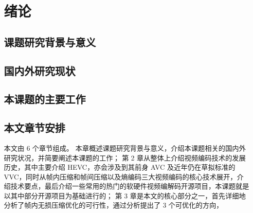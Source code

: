 \chapter{绪论}
\label{cha:c1}

\section{课题研究背景与意义}

\section{国内外研究现状}

\section{本课题的主要工作}

\section{本文章节安排}
本文由 6 个章节组成。
本章概述课题研究背景与意义，介绍本课题相关的国内外研究状况，并简要阐述本课题的工作；
第 2 章从整体上介绍视频编码技术的发展历史，其中主要介绍 HEVC，亦会涉及到其前身 AVC 及近年仍在草拟标准的 VVC，同时从帧内压缩和帧间压缩以及熵编码三大视频编码的核心技术展开，介绍技术要点，最后介绍一些常用的热门的软硬件视频编解码开源项目，本课题就是以其中部分开源项目为基础进行的；
第 3 章是本文的核心部分之一，首先详细地分析了帧内无损压缩优化的可行性，通过分析提出了 3 个可优化的方向，

